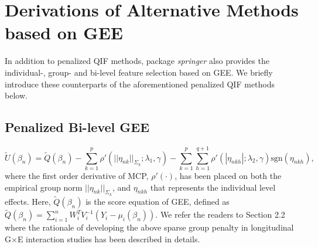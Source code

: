 \documentclass[12pt]{article}
\begin{document}


\section{Derivations of Alternative Methods based on GEE}
\label{appendix:b}

In addition to penalized QIF methods, package \emph{springer} also provides the individual-, group- and bi-level feature selection based on GEE. We briefly introduce these counterparts of the aforementioned penalized QIF methods below. 

\subsection{Penalized Bi-level GEE}


\begin{equation*}
\tilde{U}(\beta_n)=\tilde{Q}(\beta_n)-\sum_{k=1}^{p}\rho'(||\eta_{nk}||_{\Sigma_{k}};\lambda_{1},\gamma)-\sum_{k=1}^{p} \sum_{h=1}^{q+1}\rho'(|\eta_{nkh}|;\lambda_{2},\gamma)\text{sgn}(\eta_{nkh}),
\end{equation*}
where the first order derivative of MCP, $\rho'(\cdot)$, has been placed on both the empirical group norm $||\eta_{nk}||_{\Sigma_{k}}$, and $\eta_{nkh}$ that represents the individual level effects. Here, $\tilde{Q}(\beta_n)$ is the score equation of GEE, defined as $\tilde{Q}(\beta_n)=\sum_{i=1}^{n}W_{i}^{T}V_i^{-1}(Y_i-\mu_i (\beta_n))$. We refer the readers to Section 2.2 where the rationale of developing the above sparse group penalty in longitudinal G$\times$E interaction studies has been described in details.
\end{document}

